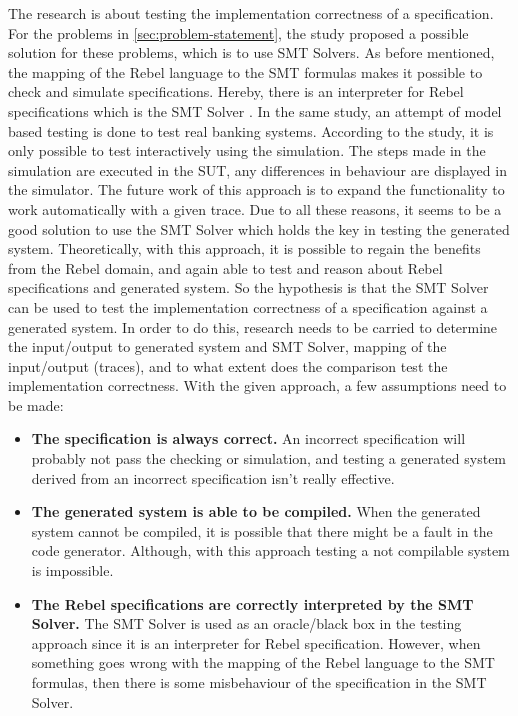 The research is about testing the implementation correctness of a specification.
For the problems in \autoref{sec:problem-statement}, the study
\cite[p.3]{stoelcase} proposed a possible solution for these problems, which is
to use SMT Solvers. As before mentioned, the mapping of the Rebel language to
the SMT formulas makes it possible to check and simulate specifications. Hereby,
there is an interpreter for Rebel specifications which is the SMT Solver
\cite[p.5]{stoel_storm_vinju_bosman_2016}. In the same study, an attempt of
model based testing is done to test real banking systems. According to the
 study, it is only possible to test interactively using the simulation. The
 steps made in the simulation are executed in the SUT, any differences in
 behaviour are displayed in the simulator. The future work of this approach is
 to expand the functionality to work automatically with a given trace. Due to
 all these reasons, it seems to be a good solution to use the SMT Solver which
 holds the key in testing the generated system. Theoretically, with this
 approach, it is possible to regain the benefits from the Rebel domain, and
 again able to test and reason about Rebel specifications and generated system.
 So the hypothesis is that the SMT Solver can be used to test the implementation
 correctness of a specification against a generated system. In order to do this,
 research needs to be carried to determine the input/output to generated system
 and SMT Solver, mapping of the input/output (traces), and to what extent does
 the comparison test the implementation correctness. With the given approach, a
 few assumptions need to be made:
\begin{itemize}
\item \textbf{The specification is always correct.} An incorrect specification
will probably not pass the checking or simulation, and testing a generated
system derived from an incorrect specification isn't really effective.
\item \textbf{The generated system is able to be compiled.} When the generated
system cannot be compiled, it is possible that there might be a fault in the
code generator. Although, with this approach testing a not compilable system is
impossible.
\item \textbf{The Rebel specifications are correctly interpreted by the SMT
Solver.} The SMT Solver is used as an oracle/black box in the testing approach
since it is an interpreter for Rebel specification. However, when something goes
wrong with the mapping of the Rebel language to the SMT formulas, then there is
some misbehaviour of the specification in the SMT Solver.
\end{itemize}

